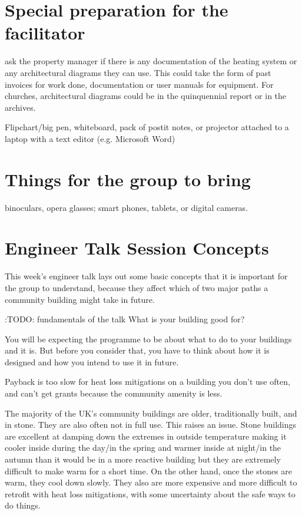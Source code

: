 \documentclass[letterpaper,10pt,english]{jupyterBook}
\begin{document}
\section{Special preparation for the facilitator}
\label{\detokenize{session1/session1:special-preparation-for-the-facilitator}}
\sphinxAtStartPar
ask the property manager if there is any documentation of the heating system or any architectural diagrams they can use.  This could take the form of past invoices for work done, documentation or user manuals for equipment.  For churches, architectural diagrams could be in the quinquennial report or in the archives.

\sphinxAtStartPar
Flipchart/big pen, whiteboard, pack of post\sphinxhyphen{}it notes, or projector attached to a laptop with a text editor (e.g. Microsoft Word)


\section{Things for the group to bring}
\label{\detokenize{session1/session1:things-for-the-group-to-bring}}
\sphinxAtStartPar
binoculars, opera glasses; smart phones, tablets, or digital cameras.

\sphinxstepscope


\section{Engineer Talk \sphinxhyphen{} Session Concepts}
\label{\detokenize{session1/details/session-concepts:engineer-talk-session-concepts}}\label{\detokenize{session1/details/session-concepts::doc}}
\sphinxAtStartPar
This week’s engineer talk lays out some basic concepts that it is important for the group to understand, because they affect which of two major paths a community building might take in future.

\sphinxAtStartPar
:TODO: fundamentals of the talk \sphinxhyphen{} What is your building good for?

\sphinxAtStartPar
You will be expecting the programme to be about what to do to your buildings \sphinxhyphen{} and it is.  But before you consider that, you have to think about how it is designed and how you intend to use it in future.

\sphinxAtStartPar
Payback is too slow for heat loss mitigations on a building you don’t use often, and can’t get grants because the community amenity is less.

\sphinxAtStartPar
The majority of the UK’s community buildings are older, traditionally built, and in stone. They are also often not in full use.  This raises an issue.  Stone buildings are excellent at damping down the extremes in outside temperature \sphinxhyphen{} making it cooler inside during the day/in the spring and warmer inside at night/in the autumn than it would be in a more reactive building \sphinxhyphen{} but they are extremely difficult to make warm for a short time.  On the other hand, once the stones are warm, they cool down slowly.  They also are more expensive and more difficult to retrofit with heat loss mitigations, with some uncertainty about the safe ways to do things.
\end{document}
